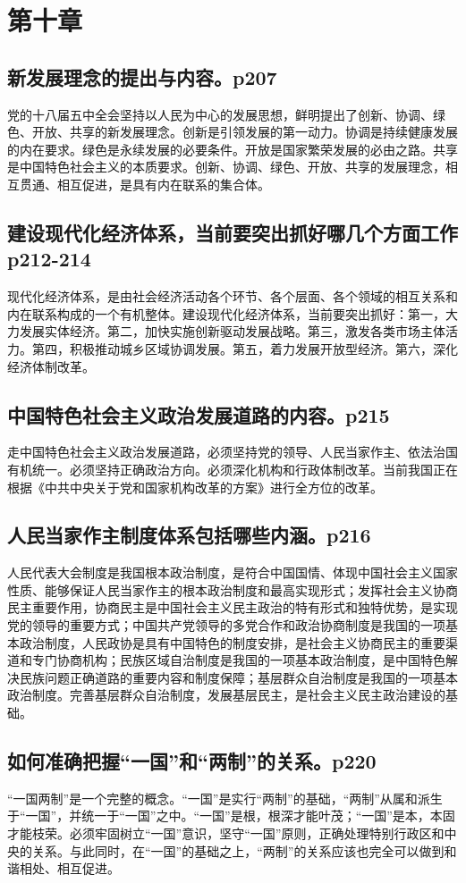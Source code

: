 \documentclass[UTF8]{ctexart}
\begin{document}
\section{第十章}
\subsection{新发展理念的提出与内容。p207}
党的十八届五中全会坚持以人民为中心的发展思想，鲜明提出了创新、协调、绿色、开放、共享的新发展理念。创新是引领发展的第一动力。协调是持续健康发展的内在要求。绿色是永续发展的必要条件。开放是国家繁荣发展的必由之路。共享是中国特色社会主义的本质要求。创新、协调、绿色、开放、共享的发展理念，相互贯通、相互促进，是具有内在联系的集合体。
\subsection{建设现代化经济体系，当前要突出抓好哪几个方面工作p212-214}
现代化经济体系，是由社会经济活动各个环节、各个层面、各个领域的相互关系和内在联系构成的一个有机整体。建设现代化经济体系，当前要突出抓好：第一，大力发展实体经济。第二，加快实施创新驱动发展战略。第三，激发各类市场主体活力。第四，积极推动城乡区域协调发展。第五，着力发展开放型经济。第六，深化经济体制改革。
\subsection{中国特色社会主义政治发展道路的内容。p215}
走中国特色社会主义政治发展道路，必须坚持党的领导、人民当家作主、依法治国有机统一。必须坚持正确政治方向。必须深化机构和行政体制改革。当前我国正在根据《中共中央关于党和国家机构改革的方案》进行全方位的改革。

\subsection{人民当家作主制度体系包括哪些内涵。p216}
人民代表大会制度是我国根本政治制度，是符合中国国情、体现中国社会主义国家性质、能够保证人民当家作主的根本政治制度和最高实现形式；发挥社会主义协商民主重要作用，协商民主是中国社会主义民主政治的特有形式和独特优势，是实现党的领导的重要方式；中国共产党领导的多党合作和政治协商制度是我国的一项基本政治制度，人民政协是具有中国特色的制度安排，是社会主义协商民主的重要渠道和专门协商机构；民族区域自治制度是我国的一项基本政治制度，是中国特色解决民族问题正确道路的重要内容和制度保障；基层群众自治制度是我国的一项基本政治制度。完善基层群众自治制度，发展基层民主，是社会主义民主政治建设的基础。
\subsection{如何准确把握“一国”和“两制”的关系。p220}
“一国两制”是一个完整的概念。“一国”是实行“两制”的基础，“两制”从属和派生于“一国”，并统一于“一国”之中。“一国”是根，根深才能叶茂；“一国”是本，本固才能枝荣。必须牢固树立“一国”意识，坚守“一国”原则，正确处理特别行政区和中央的关系。与此同时，在“一国”的基础之上，“两制”的关系应该也完全可以做到和谐相处、相互促进。
\end{document}

